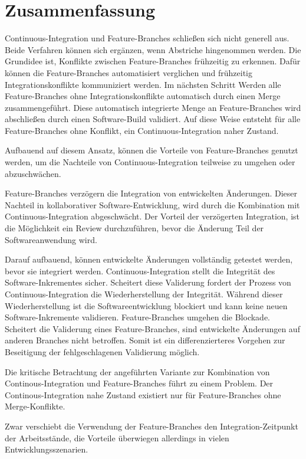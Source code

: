 \chapter{Zusammenfassung}

Continuous-Integration und Feature-Branches schließen sich nicht generell aus. Beide Verfahren können sich ergänzen, wenn Abstriche hingenommen werden. Die Grundidee ist, Konflikte zwischen Feature-Branches frühzeitig zu erkennen. Dafür können die Feature-Branches automatisiert verglichen und frühzeitig Integrationskonflikte kommuniziert werden. Im nächsten Schritt Werden alle Feature-Branches ohne Integrationskonflikte automatisch durch einen Merge zusammengeführt. Diese automatisch integrierte Menge an Feature-Branches wird abschließen durch einen Software-Build validiert. Auf diese Weise entsteht für alle Feature-Branches ohne Konflikt, ein Continuous-Integration naher Zustand.

Aufbauend auf diesem Ansatz, können die Vorteile von Feature-Branches genutzt werden, um die Nachteile von Continuous-Integration teilweise zu umgehen oder abzuschwächen.

Feature-Branches verzögern die Integration von entwickelten Änderungen. Dieser Nachteil in kollaborativer Software-Entwicklung, wird durch die Kombination mit Continuous-Integration abgeschwächt. Der Vorteil der verzögerten Integration, ist die Möglichkeit ein Review durchzuführen, bevor die Änderung Teil der Softwareanwendung wird. 

Darauf aufbauend, können entwickelte Änderungen vollständig getestet werden, bevor sie integriert werden. Continuous-Integration stellt die Integrität des Software-Inkrementes sicher. Scheitert diese Validerung fordert der Prozess von Continuous-Integration die Wiederherstellung der Integrität. Während dieser Wiederherstellung ist die Softwareentwicklung blockiert und kann keine neuen Software-Inkremente validieren. Feature-Branches umgehen die Blockade. Scheitert die Validerung eines Feature-Branches, sind entwickelte Änderungen auf anderen Branches nicht betroffen. Somit ist ein differenzierteres Vorgehen zur Beseitigung der fehlgeschlagenen Validierung möglich.

Die kritische Betrachtung der angeführten Variante zur Kombination von Continous-Integration und Feature-Branches führt zu einem Problem. Der Continous-Integration nahe Zustand existiert nur für Feature-Branches ohne Merge-Konflikte.




Zwar verschiebt die Verwendung der Feature-Branches den Integration-Zeitpunkt der Arbeitsstände, die Vorteile überwiegen allerdings in vielen Entwicklungsszenarien.

